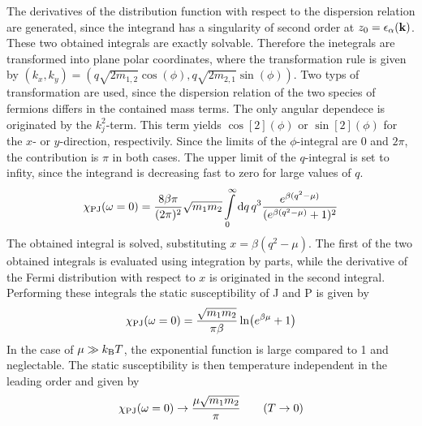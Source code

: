 %
The derivatives of the distribution function with respect to the dispersion relation are generated, since the integrand has a singularity of second order at $z_{0} = \epsilon_{\alpha}(\vb{k})$.
These two obtained integrals are exactly solvable.
Therefore the inetegrals are transformed into plane polar coordinates, where the transformation rule is given by $(k_{x}, k_{y}) = (q\sqrt{2m_{1,2}}\cos(\phi), q\sqrt{2m_{2,1}}\sin(\phi))$.
Two typs of transformation are used, since the dispersion relation of the two species of fermions differs in the contained mass terms.
The only angular dependece is originated by the $k_{j}^{2}$-term.
This term yields $\cos[2](\phi)$ or $\sin[2](\phi)$ for the $x$- or $y$-direction, respectivily.
Since the limits of the $\phi$-integral are $0$ and $2\pi$, the contribution is $\pi$ in both cases.
The upper limit of the $q$-integral is set to infity, since the integrand is decreasing fast to zero for large values of $q$.
%
\begin{align}
	\chi_{\mathrm{PJ}}(\omega = 0) = 
		\frac{8 \beta \pi}{(2\pi)^{2}} \sqrt{m_{1} m_{2}}
		\int\limits_{0}^{\infty} \dd{q}
		q^{3} \frac{e^{\beta(q^{2} - \mu)}}{(e^{\beta(q^{2} - \mu)} + 1)^{2}}
\end{align}
%
The obtained integral is solved, substituting $x = \beta(q^{2} - \mu)$.
The first of the two obtained integrals is evaluated using integration by parts, while the derivative of the Fermi distribution with respect to $x$ is originated in the second integral.
Performing these integrals the static susceptibility of J and P is given by
%
\begin{align}
	\chi_{\mathrm{PJ}}(\omega = 0) = \frac{\sqrt{m_{1} m_{2}}}{\pi \beta}\ln(e^{\beta \mu} + 1)
\end{align}
%
In the case of $\mu \gg k_{\mathrm{B}} T$, the exponential function is large compared to 1 and neglectable.
The static susceptibility is then temperature independent in the leading order and given by
%
\begin{align}
	\chi_{\mathrm{PJ}}(\omega = 0) \to \frac{\mu \sqrt{m_{1} m_{2}}}{\pi} \qquad (T \to 0)
\end{align}
%
